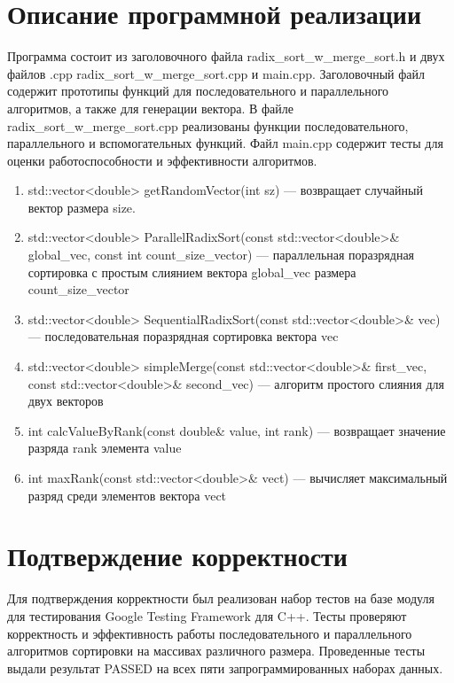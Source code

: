 \documentclass{report}
\begin{document}
\section*{Описание программной реализации}
Программа состоит из заголовочного файла radix\_sort\_w\_merge\_sort.h и двух файлов .cpp radix\_sort\_w\_merge\_sort.cpp и main.cpp. Заголовочный файл содержит прототипы функций для последовательного и параллельного алгоритмов, а также для генерации вектора. В файле radix\_sort\_w\_merge\_sort.cpp реализованы функции последовательного, параллельного и вспомогательных функций. Файл main.cpp содержит тесты для оценки работоспособности и эффективности алгоритмов.
\begin{enumerate}
\item std::vector<double> getRandomVector(int sz) — возвращает случайный вектор размера size.
\item std::vector<double> ParallelRadixSort(const std::vector<double>\& global\_vec, const int count\_size\_vector) — параллельная поразрядная сортировка с простым слиянием вектора global\_vec размера count\_size\_vector
\item std::vector<double> SequentialRadixSort(const std::vector<double>\& vec) — последовательная поразрядная сортировка вектора vec
\item std::vector<double> simpleMerge(const std::vector<double>\& first\_vec, const std::vector<double>\& second\_vec) — алгоритм простого слияния для двух векторов
\item int calcValueByRank(const double\& value, int rank) — возвращает значение разряда rank элемента value
\item int maxRank(const std::vector<double>\& vect) — вычисляет максимальный разряд среди элементов вектора vect

\end{enumerate}
\newpage
\section*{Подтверждение корректности}
Для подтверждения корректности был реализован набор тестов на базе модуля для тестирования Google Testing Framework для C++.
Тесты проверяют корректность и эффективность работы последовательного и параллельного алгоритмов сортировки на массивах различного размера.
Проведенные тесты выдали результат PASSED на всех пяти запрограммированных наборах данных.
\newpage
\end{document}
